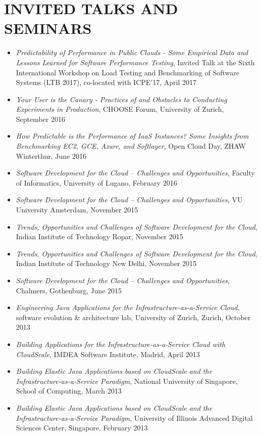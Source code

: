 \documentclass[paper=letter,fontsize=11pt]{scrartcl} %
\newcommand{\NewPart}[2]{\section*{\uppercase{#1} #2}}
\begin{document}
\NewPart{Invited Talks and Seminars}{}

\begin{itemize}
\item \emph{Predictability of Performance in Public Clouds - Some Empirical Data and Lessons Learned for Software Performance Testing}, Invited Talk at the Sixth International Workshop on Load Testing and Benchmarking of Software Systems (LTB 2017), co-located with ICPE'17, April 2017
\item \emph{Your User is the Canary - Practices of and Obstacles to Conducting Experiments in Production}, CHOOSE Forum, University of Zurich, September 2016
\item \emph{How Predictable is the Performance of IaaS Instances? Some Insights from Benchmarking EC2, GCE, Azure, and Softlayer}, Open Cloud Day, ZHAW Winterthur, June 2016
\item \emph{Software Development for the Cloud – Challenges and Opportunities}, Faculty of Informatics, University of Lugano, February 2016
\item \emph{Software Development for the Cloud – Challenges and Opportunities}, VU University Amsterdam, November 2015
\item \emph{Trends, Opportunities and Challenges of Software Development for the Cloud}, Indian Institute of Technology Ropar, November 2015
\item \emph{Trends, Opportunities and Challenges of Software Development for the Cloud}, Indian Institute of Technology New Delhi, November 2015
\item \emph{Software Development for the Cloud -- Challenges and Opportunities}, Chalmers, Gothenburg, June 2015
\item \emph{Engineering Java Applications for the Infrastructure-as-a-Service Cloud}, software evolution \& architecture lab, University of Zurich, Zurich, October 2013
\item \emph{Building Applications for the Infrastructure-as-a-Service Cloud with CloudScale}, IMDEA Software Institute, Madrid, April 2013
\item \emph{Building Elastic Java Applications based on CloudScale and the Infrastructure-as-a-Service Paradigm}, National University of Singapore, School of Computing, March 2013
\item \emph{Building Elastic Java Applications based on CloudScale and the Infrastructure-as-a-Service Paradigm}, University of Illinois Advanced Digital Sciences Center, Singapore, February 2013
\end{itemize}
\end{document}
